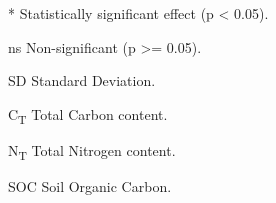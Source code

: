 \begin{table}[htbp]
\begin{threeparttable}
\begin{tablenotes}
        \item[*] Statistically significant effect (p < 0.05).
        \item[ns] Non-significant (p >= 0.05).
        \item[SD] Standard Deviation.
        \item[C\textsubscript{T}] Total Carbon content.
        \item[N\textsubscript{T}] Total Nitrogen content.
        \item[SOC] Soil Organic Carbon.
      \end{tablenotes}
    \end{threeparttable}
  \end{table}